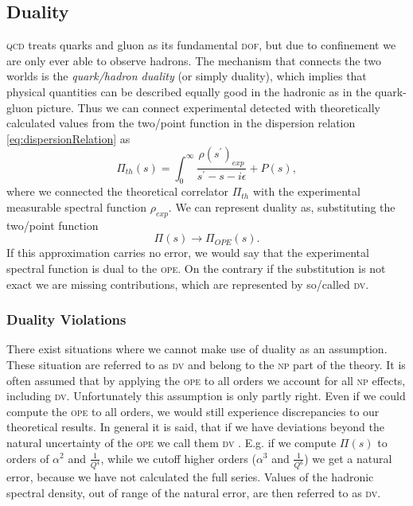 \documentclass[../../index.tex]{subfiles}
\begin{document}
\subsection{Duality}
\label{sec:duality}
\textsc{qcd} treats quarks and gluon as its fundamental \textsc{dof}, but due to
confinement we are only ever able to observe hadrons. The mechanism that
connects the two worlds is the \textit{quark\-/hadron duality} (or simply
duality), which implies that physical quantities can be described equally good
in the hadronic as in the quark-gluon picture. Thus we can connect experimental
detected with theoretically calculated values from the two\-/point function in
the dispersion relation \cref{eq:dispersionRelation} as
\begin{equation}
  \Pi_{th}(s) = \int_0^\infty \frac{\rho(s^\prime)_{exp}}{s^\prime-s-i\epsilon} + P(s),
\end{equation}
where we connected the theoretical correlator \(\Pi_{th}\) with the experimental
measurable spectral function \(\rho_{exp}\). We can represent duality as,
substituting the two\-/point function \cite{Cata2005}
\begin{equation}
  \Pi(s) \to \Pi_{OPE}(s).
\end{equation}
If this approximation carries no error, we would say that the experimental
spectral function is dual to the \textsc{ope}. On the contrary if the
substitution is not exact we are missing contributions, which are represented by
so\-/called \textsc{dv}.


\subsubsection{Duality Violations}
There exist situations where we cannot make use of duality as an assumption.
These situation are referred to as \textsc{dv} and belong to the \textsc{np}
part of the theory. It is often assumed that by applying the \textsc{ope} to all
orders we account for all \textsc{np} effects, including \textsc{dv}.
Unfortunately this assumption is only partly right. Even if we could compute the
\textsc{ope} to all orders, we would still experience discrepancies to our
theoretical results. In general it is said, that if we have deviations beyond
the natural uncertainty of the \textsc{ope} we call them \textsc{dv}
\cite{Shifman2000}. E.g. if we compute \(\Pi(s)\) to orders of \(\alpha^2\) and
\(\frac{1}{Q^4}\), while we cutoff higher orders (\(\alpha^3\) and
\(\frac{1}{Q^6}\)) we get a natural error, because we have not calculated the
full series. Values of the hadronic spectral density, out of range of the
natural error, are then referred to as \textsc{dv}.
\end{document}
